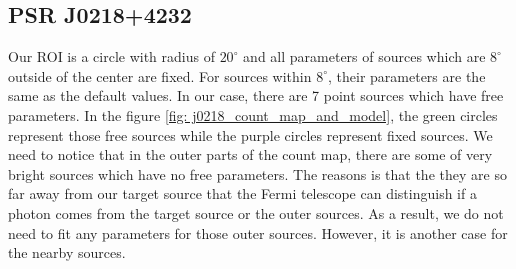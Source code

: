 \documentclass[12pt]{report}
\begin{document}
        \subsection{PSR J0218+4232}
          \label{j0218}
          Our ROI is a circle with radius of $20^\circ$ and all parameters of sources which are $8^\circ$ outside 
          of the center are fixed. For sources within $8^\circ$, their parameters are the same as the default values. 
          In our case, there are 7 point sources which have free parameters. In the figure 
          \ref{fig: j0218_count_map_and_model}, the green circles represent those free sources while the purple circles 
          represent fixed sources. We need to notice that in the outer parts of the count map, there are some of very 
          bright sources which have no free parameters. The reasons is that the they are so far away from our target source
          that the Fermi telescope can distinguish if a photon comes from the target source or the outer sources.
          As a result, we do not need to fit any parameters for those outer sources. 
          However, it is another case for the nearby sources. 
          
\end{document}

